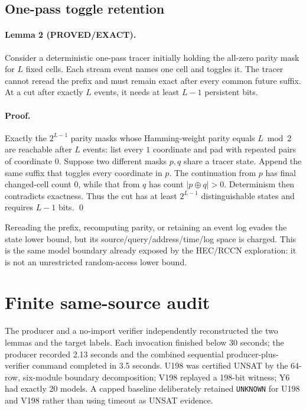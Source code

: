 \documentclass[11pt]{article}
\newcommand{\status}[1]{\textsf{#1}}
\begin{document}
\subsection{One-pass toggle retention}
\paragraph{Lemma 2 (\status{PROVED/EXACT}).}
Consider a deterministic one-pass tracer initially holding the all-zero parity mask for $L$ fixed cells.  Each stream event names one cell and toggles it.  The tracer cannot reread the prefix and must remain exact after every common future suffix.  At a cut after exactly $L$ events, it needs at least $L-1$ persistent bits.

\paragraph{Proof.}
Exactly the $2^{L-1}$ parity masks whose Hamming-weight parity equals $L\bmod 2$ are reachable after $L$ events: list every $1$ coordinate and pad with repeated pairs of coordinate $0$.  Suppose two different masks $p,q$ share a tracer state.  Append the same suffix that toggles every coordinate in $p$.  The continuation from $p$ has final changed-cell count $0$, while that from $q$ has count $|p\oplus q|>0$.  Determinism then contradicts exactness.  Thus the cut has at least $2^{L-1}$ distinguishable states and requires $L-1$ bits. \qed

Rereading the prefix, recomputing parity, or retaining an event log evades the state lower bound, but its source/query/address/time/log space is charged.  This is the same model boundary already exposed by the HEC/RCCN exploration: it is not an unrestricted random-access lower bound.

\section{Finite same-source audit}
The producer and a no-import verifier independently reconstructed the two lemmas and the target labels.  Each invocation finished below 30 seconds; the producer recorded 2.13 seconds and the combined sequential producer-plus-verifier command completed in 3.5 seconds.  U198 was certified UNSAT by the 64-row, six-module boundary decomposition; V198 replayed a 198-bit witness; Y6 had exactly 20 models.  A capped baseline deliberately retained \texttt{UNKNOWN} for U198 and V198 rather than using timeout as UNSAT evidence.
\end{document}
